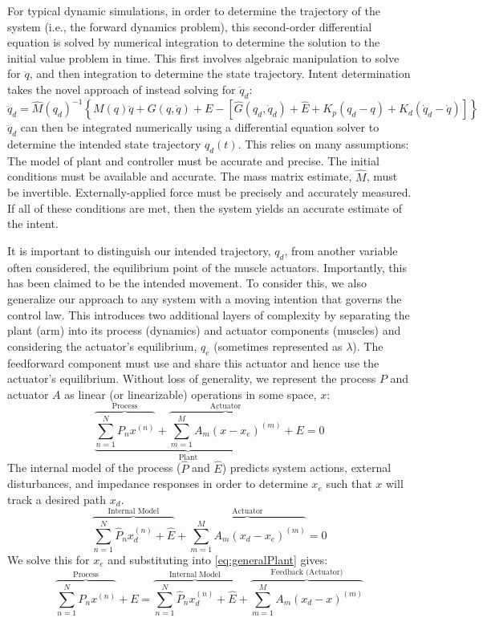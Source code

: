 \documentclass[10pt]{article}
\begin{document}
For typical dynamic simulations, in order to determine the trajectory of the system (i.e., the forward dynamics problem), this second-order differential equation is solved by numerical integration to determine the solution to the initial value problem in time. This first involves algebraic manipulation to solve for $\ddot{q}$, and then integration to determine the state trajectory. Intent determination takes the novel approach of instead solving for $\ddot{q}_d$:
\begin{equation}
\ddot{q}_d=\hat{M}(q_d)^{-1}\left\{M(q)\ddot{q}+G(q,\dot{q})+E-[\hat{G}(q_d,\dot{q}_d)+\hat{E}+K_p(q_d-q)+K_d(\dot{q}_d-\dot{q})]\right\}
\end{equation}  
$\ddot{q}_d$ can then be integrated numerically using a differential equation solver to determine the intended state trajectory $q_d(t)$. This relies on many assumptions: The model of plant and controller must be accurate and precise. The initial conditions must be available and accurate. The mass matrix estimate, $\hat{M}$, must be invertible. Externally-applied force must be precisely and accurately measured. If all of these conditions are met, then the system yields an accurate estimate of the intent.

It is important to distinguish our intended trajectory, $q_d$, from another variable often considered, the equilibrium point of the muscle actuators. Importantly, this has been claimed to be the intended movement. To consider this, we also generalize our approach to any system with a moving intention that governs the control law. This introduces two additional layers of complexity by separating the plant (arm) into its process (dynamics) and actuator components (muscles) and considering the actuator's equilibrium, $q_e$ (sometimes represented as $\lambda$). The feedforward component must use and share this actuator and hence use the actuator's equilibrium. Without loss of generality, we represent the process $P$ and actuator $A$ as linear (or linearizable) operations in some space, $x$:
\begin{equation} \label{eq:generalPlant}
\underbrace{\overbrace{\sum_{n=1}^N P_nx^{(n)}}^\text{Process}+\overbrace{\sum_{m=1}^M A_m(x-x_e)^{(m)}}^\text{Actuator}}_\text{Plant}+E=0
\end{equation}
The internal model of the process ($\hat{P}$ and $\hat{E}$) predicts system actions, external disturbances, and impedance responses in order to determine $x_e$ such that $x$ will track a desired path $x_d$.    
\begin{equation}
\overbrace{\sum_{n=1}^N \hat{P}_n x^{(n)}_d+\hat{E}}^\text{Internal Model}+\overbrace{\sum_{m=1}^M A_m(x_d-x_e)^{(m)}}^\text{Actuator}=0
\end{equation}
We solve this for $x_e$ and substituting into \eqref{eq:generalPlant} gives:
\begin{equation}
\overbrace{\sum_{n=1}^N P_nx^{(n)}}^\text{Process}+E=\overbrace{\sum_{n=1}^N \hat{P}_n x^{(n)}_d+\hat{E}}^\text{Internal Model}+\overbrace{\sum_{m=1}^M A_m (x_d-x)^{(m)}}^\text{Feedback (Actuator)}
\end{equation}
\end{document}

